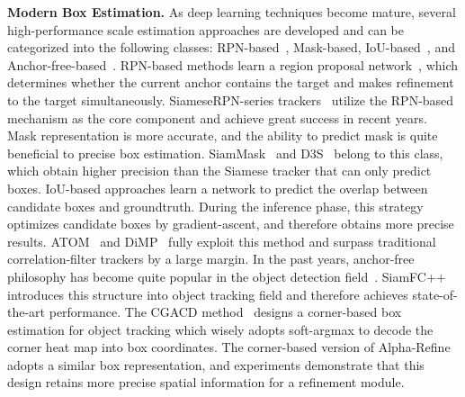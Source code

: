 \documentclass[final]{cvpr}
\begin{document}
{\noindent \textbf{Modern Box Estimation.}} 
As deep learning techniques become mature, several high-performance scale 
estimation approaches are developed and can be categorized into the following classes: RPN-based~\cite{SiameseRPN,DSiam,SiamRPNplus}, Mask-based\cite{SiamMask,D3S}, IoU-based~\cite{ATOM,DiMP},
and Anchor-free-based~\cite{SiamFC++,TransT}. 
RPN-based methods learn a region proposal network~\cite{FasterRCNN}, which determines whether the current anchor 
contains the target and makes refinement to the target simultaneously. 
SiameseRPN-series trackers~\cite{SiameseRPN,DSiam,SiamRPNplus} utilize the RPN-based 
mechanism as the core component and achieve great success in recent years. 
Mask representation is more accurate, and the ability to predict mask is quite 
beneficial to precise box estimation.
SiamMask~\cite{SiamMask} and D3S~\cite{D3S} belong to this class, which obtain higher precision 
than the Siamese tracker that can only predict boxes.
IoU-based approaches learn a network to predict the overlap between candidate boxes and groundtruth. 
During the inference phase, this strategy optimizes candidate boxes by gradient-ascent, 
and therefore obtains more precise results. 
ATOM~\cite{ATOM} and DiMP~\cite{DiMP} fully exploit this method and surpass traditional 
correlation-filter trackers by a large margin. 
In the past years, anchor-free philosophy has become quite popular in the object detection 
field~\cite{CornerNet,CenterNet,Foveabox,FCOS}. 
SiamFC++~\cite{SiamFC++} introduces this structure into object tracking field and therefore 
achieves state-of-the-art performance. 
The CGACD method~\cite{CGACD} designs a corner-based box estimation for object tracking which wisely adopts soft-argmax to decode the corner heat map into box coordinates. The corner-based version of Alpha-Refine 
adopts a similar box representation, and experiments demonstrate that this design retains more precise 
spatial information for a refinement module.
\end{document}
